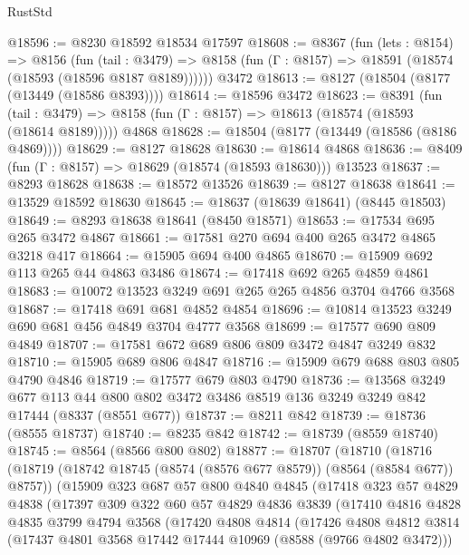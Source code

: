 \begin{lexlean}{RustStd}
\begin{coremodule}
@18596 := @8230 @18592 @18534 @17597
@18608 := @8367
    (fun (lets : @8154) =>
    @8156
      (fun (tail : @3479) =>
      @8158 (fun (Γ : @8157) => @18591 (@18574 (@18593 (@18596 @8187 @8189))))))
    @3472
@18613 := @8127 (@18504 (@8177 (@13449 (@18586 @8393))))
@18614 := @18596 @3472
@18623 := @8391
    (fun (tail : @3479) => @8158 (fun (Γ : @8157) => @18613 (@18574 (@18593 (@18614 @8189)))))
    @4868
@18628 := @18504 (@8177 (@13449 (@18586 (@8186 @4869))))
@18629 := @8127 @18628
@18630 := @18614 @4868
@18636 := @8409 (fun (Γ : @8157) => @18629 (@18574 (@18593 @18630))) @13523
@18637 := @8293 @18628
@18638 := @18572 @13526
@18639 := @8127 @18638
@18641 := @13529 @18592 @18630
@18645 := @18637 (@18639 @18641) (@8445 @18503)
@18649 := @8293 @18638 @18641 (@8450 @18571)
@18653 := @17534 @695 @265 @3472 @4867
@18661 := @17581 @270 @694 @400 @265 @3472 @4865 @3218 @417
@18664 := @15905 @694 @400 @4865
@18670 := @15909 @692 @113 @265 @44 @4863 @3486
@18674 := @17418 @692 @265 @4859 @4861
@18683 := @10072 @13523 @3249 @691 @265 @265 @4856 @3704 @4766 @3568
@18687 := @17418 @691 @681 @4852 @4854
@18696 := @10814 @13523 @3249 @690 @681 @456 @4849 @3704 @4777 @3568
@18699 := @17577 @690 @809 @4849
@18707 := @17581 @672 @689 @806 @809 @3472 @4847 @3249 @832
@18710 := @15905 @689 @806 @4847
@18716 := @15909 @679 @688 @803 @805 @4790 @4846
@18719 := @17577 @679 @803 @4790
@18736 := @13568
    @3249
    @677
    @113
    @44
    @800
    @802
    @3472
    @3486
    @8519
    @136
    @3249
    @3249
    @842
    @17444
    (@8337 (@8551 @677))
@18737 := @8211 @842
@18739 := @18736 (@8555 @18737)
@18740 := @8235 @842
@18742 := @18739 (@8559 @18740)
@18745 := @8564 (@8566 @800 @802)
@18877 := @18707
    (@18710
      (@18716
        (@18719 (@18742 @18745 (@8574 (@8576 @677 @8579)) (@8564 (@8584 @677)) @8757))
        (@15909
          @323
          @687
          @57
          @800
          @4840
          @4845
          (@17418
            @323
            @57
            @4829
            @4838
            (@17397
              @309
              @322
              @60
              @57
              @4829
              @4836
              @3839
              (@17410
                @4816
                @4828
                @4835
                @3799
                @4794
                @3568
                (@17420
                  @4808
                  @4814
                  (@17426
                    @4808
                    @4812
                    @3814
                    (@17437 @4801 @3568 @17442 @17444 @10969 (@8588 (@9766 @4802 @3472)))

\end{coremodule}
\end{lexlean}
